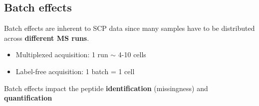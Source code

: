 \documentclass{article}
\begin{document}
\begin{multicols}{2}
\noindent
\begin{minipage}[t]{\linewidth}
  \vspace{0.5cm}
  \section*{\huge Batch effects}

  Batch effects are inherent to SCP data since many samples have to 
  be distributed across \textbf{different MS runs}. 
  
  \begin{itemize}
    \item Multiplexed acquisition: 1 run $\sim$ 4-10 cells
    \item Label-free acquisition: 1 batch = 1 cell
  \end{itemize}
  
  Batch effects impact the peptide \textbf{identification} 
  (missingness) and \textbf{quantification}


\end{minipage}
\end{multicols}
\end{document}
